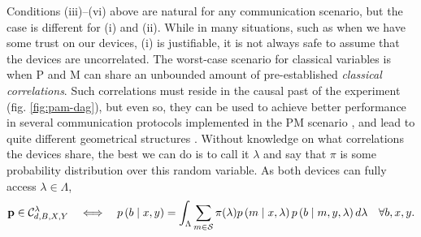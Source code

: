             Conditions (iii)--(vi) above are natural for any communication scenario, but the case is different for (i) and (ii). While in many situations, such as when we have some trust on our devices, (i) is justifiable, it is not always safe to assume that the devices are uncorrelated. The worst-case scenario for classical variables is when P and M can share an unbounded amount of pre-established \emph{classical correlations}. Such correlations must reside in the causal past of the experiment (fig. \ref{fig:pam-dag}), but even so, they can be used to achieve better performance in several communication protocols implemented in the PM scenario \cite{de_vicente_bound_2019}, and lead to quite different geometrical structures \cite{de_vicente_shared_2017,dallarno_robustness_2012}. Without knowledge on what correlations the devices share, the best we can do is to call it $\lambda$ and say that $\pi$ is some probability distribution over this random variable. As both devices can fully access $\lambda \in \Lambda$,
            \begin{equation}
                \mathbf{p} \in \mathcal{C}_{d,B,X,Y}^\lambda \quad\Longleftrightarrow \quad p \left( b \mid x,y \right) = \int_{\Lambda} \sum_{m \in \mathcal{S}} \pi(\lambda) p \left( m \mid x,\lambda \right) p \left( b \mid m,y,\lambda \right) d\lambda \quad\forall b,x,y .
                \label{eq:pam-classical-sr}
            \end{equation}
